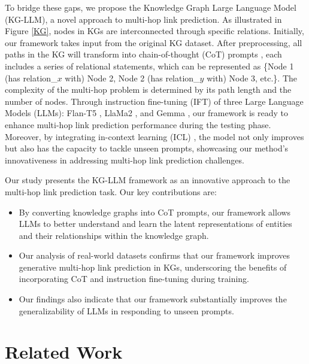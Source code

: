 \documentclass[pmlr]{jmlr}%
\begin{document}
To bridge these gaps, we propose the Knowledge Graph Large Language Model (KG-LLM), a novel approach to multi-hop link prediction. As illustrated in Figure \ref{KG}, nodes in KGs are interconnected through specific relations. Initially, our framework takes input from the original KG dataset. After preprocessing, all paths in the KG will transform into chain-of-thought (CoT) prompts \citep{wei2022chain, jin2024impact}, each includes a series of relational statements, which can be represented as \{Node 1 (has relation\_$x$ with) Node 2, Node 2 (has relation\_$y$ with) Node 3, etc.\}. The complexity of the multi-hop problem is determined by its path length and the number of nodes. Through instruction fine-tuning (IFT) \citep{wei2021finetuned} of three Large Language Models (LLMs): Flan-T5 \citep{wei2021finetuned}, LlaMa2 \citep{touvron2023llama}, and Gemma \citep{team2023gemini}, our framework is ready to enhance multi-hop link prediction performance during the testing phase. Moreover, by integrating in-context learning (ICL) \citep{xie2021explanation}, the model not only improves but also has the capacity to tackle unseen prompts, showcasing our method's innovativeness in addressing multi-hop link prediction challenges.

Our study presents the KG-LLM framework as an innovative approach to the multi-hop link prediction task. Our key contributions are:
\begin{itemize}
    \item By converting knowledge graphs into CoT prompts, our framework allows LLMs to better understand and learn the latent representations of entities and their relationships within the knowledge graph.
    \item Our analysis of real-world datasets confirms that our framework improves generative multi-hop link prediction in KGs, underscoring the benefits of incorporating CoT and instruction fine-tuning during training. 

    \item Our findings also indicate that our framework substantially improves the generalizability of LLMs in responding to unseen prompts.
\end{itemize}


\section{Related Work}

\end{document}
